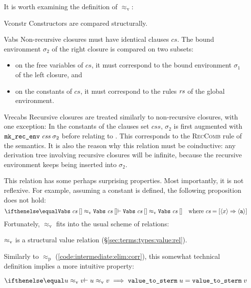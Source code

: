It is worth examining the definition of $\approx_\text{v}$:
\begin{semantics}
  \item[Vconstr]
    Constructors are compared structurally.
  \item[Vabs]
    Non-recursive closures must have identical clauses $\mathit{cs}$.
    The bound environment $\sigma_2$ of the right closure is compared on two subsets:
    \begin{itemize}
      \item on the free variables of $\mathit{cs}$, it must correspond to the bound environment $\sigma_1$ of the left closure, and
      \item on the constants of $\mathit{cs}$, it must correspond to the rules $\textit{rs}$ of the global environment.
    \end{itemize}
  \item[Vrecabs]
    Recursive closures are treated similarly to non-recursive closures, with one exception:
    In the constants of the clauses set $\mathit{css}$, $\sigma_2$ is first augmented with $\texttt{\textup{mk\_rec\_env}}\;\textit{css}\;\sigma_2$ before relating to \rs.
    This corresponds to the \textsc{RecComb} rule of the semantics.
    It is also the reason why this relation must be coinductive:
    any derivation tree involving recursive closures will be infinite, because the recursive environment keeps being inserted into $\sigma_2$.
\end{semantics}

\noindent
This relation has some perhaps surprising properties.
Most importantly, it is not reflexive.
For example, assuming a constant  is defined, the following proposition does not hold:
%
\[
  \corrv{\holconst{Vabs}\;\cs\;[]}{\holconst{Vabs}\;\cs\;[]} \quad\text{where}\;\cs = [\embed{x} \Rightarrow \embed{\holconst{a}}]
\]
%
Fortunately, $\approx_\text{v}$ fits into the usual scheme of relations:

\begin{corollary}
  $\approx_\text{\normalfont v}$ is a structural value relation (§\ref{sec:terms:types:value:rel}).
\end{corollary}

\noindent
Similarly to $\approx_\text{p}$ (\cref{code:intermediate:elim:corr}), this somewhat technical definition implies a more intuitive property:
\begin{lemma}
  $\corrv{u}{v} \implies \holconst{value\_to\_sterm}\;u = \holconst{value\_to\_sterm}\;v$
\end{lemma}

